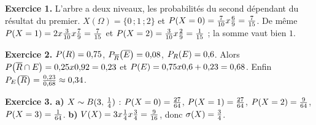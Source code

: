 \begin{corrige}
\textbf{Exercice 1.} L'arbre a deux niveaux, les probabilités du second dépendant du
résultat du premier. $X(\Omega) = \{0\,;1\,;2\}$ et
$\proba{X = 0} = \frac{7}{10} \times \frac69 = \frac{7}{15}$. De même
$\proba{X = 1} = 2 \times \frac{3}{10} \times \frac79 = \frac{7}{15}$ et
$\proba{X = 2} = \frac{3}{10} \times \frac29 = \frac{1}{15}$ ; la somme vaut
bien $1$.

\textbf{Exercice 2.} $\proba{R} = 0{,}75$, $\probacond{\evtc{E}}{\evtc{R}} = 0{,}08$,
$\probacond{E}{R} = 0{,}6$. Alors
$\proba{\evtc{R} \cap E} = 0{,}25 \times 0{,}92 = 0{,}23$ et
$\proba{E} = 0{,}75 \times 0{,}6+0{,}23 = 0{,}68$. Enfin
$\probacond{\evtc{R}}{E} = \frac{0{,}23}{0{,}68} \approx 0{,}34$.

\textbf{Exercice 3. a)} $X \sim \loibin{3}{\frac14}$ :
$\proba{X = 0} = \frac{27}{64}$, $\proba{X = 1} = \frac{27}{64}$,
$\proba{X = 2} = \frac{9}{64}$, $\proba{X = 3} = \frac{1}{64}$.
\textbf{b)} $\Var(X) = 3 \times \frac14 \times \frac34 = \frac{9}{16}$, donc
$\ecart(X) = \frac34$.

\end{corrige}
